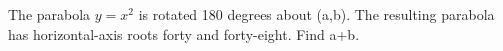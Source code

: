 The parabola $y=x^2$ is rotated 180 degrees about (a,b). The resulting parabola has horizontal-axis roots forty and forty-eight. Find a+b.
